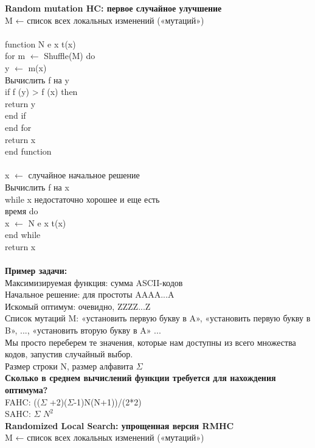 \textbf{Random mutation HC: первое случайное улучшение}\\
M ← список всех локальных изменений («мутаций») \\
\\
function N e x t(x)  \\
\tab for m $\leftarrow$ Shuffle(M) do\\  
\tab \tab y $\leftarrow$ m(x)\\  
\tab \tab Вычислить f на y\\  
\tab \tab if f (y) > f (x) then\\  
\tab \tab \tab return y\\   
\tab \tab end if\\  
\tab end for\\  
\tab return x\\  
end function \\ 
\\
x $\leftarrow$ случайное начальное решение\\  
Вычислить f на x\\  
while x недостаточно хорошее и еще есть\\  
время do \\ 
\tab x $\leftarrow$ N e x t(x)\\  
end while \\
return x \\
\\
\textbf{Пример задачи:}\\
Максимизируемая функция: сумма ASCII-кодов\\
Начальное решение: для простоты AAAA...A\\
Искомый оптимум: очевидно, ZZZZ...Z\\
Список мутаций M: «установить первую букву в A», «установить первую букву в B», ..., «установить вторую букву в A» ...\\
Мы просто переберем те значения, которые нам доступны из всего множества кодов, запустив случайный выбор. \\
Размер строки N, размер алфавита $\Sigma$ \\

\textbf{Сколько в среднем вычислений функции требуется для нахождения оптимума?}\\
FAHC: (($\Sigma$ +2)($\Sigma$-1)N(N+1))/(2*2)\\
SAHC: $\Sigma$ $N^2$ \\


\textbf{Randomized Local Search: упрощенная версия RMHC}\\
M ← список всех локальных изменений («мутаций») \\

